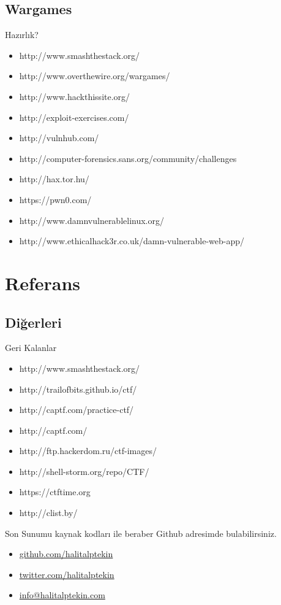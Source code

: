 \documentclass[compress]{beamer}
\begin{document}
\subsection{Wargames}

\begin{frame}{Hazırlık?}

\begin{itemize}
	\item http://www.smashthestack.org/
    \item http://www.overthewire.org/wargames/
    \item http://www.hackthissite.org/
    \item http://exploit-exercises.com/
    \item http://vulnhub.com/
    \item http://computer-forensics.sans.org/community/challenges
    \item http://hax.tor.hu/
    \item https://pwn0.com/
    \item http://www.damnvulnerablelinux.org/
    \item http://www.ethicalhack3r.co.uk/damn-vulnerable-web-app/
    \end{itemize}
\end{frame}

\section{Referans}

\subsection{Diğerleri}

\begin{frame}{Geri Kalanlar}

\begin{itemize}
	\item http://www.smashthestack.org/
	\item http://trailofbits.github.io/ctf/
	\item http://captf.com/practice-ctf/
	\item http://captf.com/
	\item http://ftp.hackerdom.ru/ctf-images/
	\item http://shell-storm.org/repo/CTF/
	\item https://ctftime.org
	\item http://clist.by/
    \end{itemize}
\end{frame}

\begin{frame}{Son}
	Sunumu kaynak kodları ile beraber Github adresimde bulabilirsiniz.
	\begin{itemize}
    	\item \url{github.com/halitalptekin}
        \item \url{twitter.com/halitalptekin}
		\item \url{info@halitalptekin.com}
	\end{itemize}
\end{frame}
\end{document}

